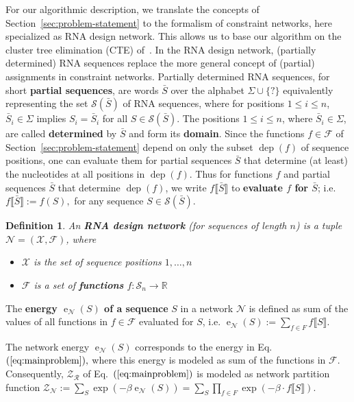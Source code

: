 \documentclass{bioinfo}
\newtheorem{definition}[theorem]{Definition}
\newcommand{\network}{\mathcal{N}}
\newcommand{\val}{\bar S} %
\newcommand{\dep}{\operatorname{dep}}
\newcommand{\energy}[1]{\operatorname{e}_{#1}}
\newcommand{\partfun}[1]{\mathcal{Z}_{#1}}
\newcommand{\real}{\mathbb{R}}
\newcommand{\F}{\mathcal{F}}
\newcommand{\R}{\mathcal{R}}
\renewcommand{\S}{\mathcal{S}}
\newcommand{\X}{\mathcal{X}}
\newcommand{\Def}[1]{{\bfseries #1}}
\newcommand{\evalfor}[2]{#1\llbracket{}#2\rrbracket{}}
\begin{document}
For our algorithmic description, we translate the concepts of
Section~\ref{sec:problem-statement} to the formalism of constraint networks, here
specialized as RNA design network. This allows us to base our
algorithm on the cluster tree elimination (CTE) of~\citet{Dechter2013}.
%
In the RNA design network, (partially determined) RNA sequences
replace the more general concept of (partial) assignments in
constraint networks. Partially determined RNA sequences, for short
\Def{partial sequences}, are words $\val$ over the alphabet
$\Sigma\cup\{?\}$ equivalently representing the set ${\mathcal S}(\val)$
of RNA sequences, where for positions $1\leq i\leq n$,
$\val_i\in\Sigma$ implies $S_i=\val_i$ for all $S\in{\mathcal
  S}(\val)$. The positions $1\leq i\leq n$, where $\val_i\in\Sigma$,
are called \Def{determined} by $\val$ and form its \Def{domain}.
%
Since the functions $f\in\F$ of Section~\ref{sec:problem-statement}
depend on only the subset $\dep(f)$ of sequence positions, one can
evaluate them for partial sequences $\val$ that determine (at least)
the nucleotides at all positions in $\dep(f)$. Thus for functions $f$
and partial sequences $\val$ that determine $\dep(f)$, we write
$\evalfor{f}{\val}$ to \Def{evaluate $f$ for $\val$}; i.e.{}
$\evalfor{f}{\val} := f(S),$ for any sequence
$S\in{\mathcal S}(\val)$.

\begin{definition}
An \Def{RNA design network} (for sequences of length $n$) is a tuple $\network=(\X,\F)$, where\vspace{-6pt}
\begin{itemize}
\item $\X$ is the set of sequence positions $1,\dots,n$
\item $\F$ is a set of \Def{functions} $f:\S_n\to\real$
\end{itemize}
\end{definition}

%
The \Def{energy $\energy{\network}(S)$ of a sequence} $S$ in a network
$\network$ is defined as sum of the values of all functions in
$f\in\F$ evaluated for $S$, i.e.
$\energy{\network}(S) := \sum_{f\in F} \evalfor{f}{S}.$

The network energy $\energy{\network}(S)$ corresponds to the energy in
Eq.~$(\ref{eq:mainproblem}),$ where this energy is modeled as sum of
the functions in $\F$. Consequently, $\partfun{\R}$ of
Eq.~$(\ref{eq:mainproblem})$ is modeled as network partition function
$\partfun{\network} := \sum_{S}\exp(-\beta\energy{\network}(S)) = \sum_{S}\prod_{f\in F} \exp( -\beta\cdot
\evalfor{f}{S} ).$
\end{document}
